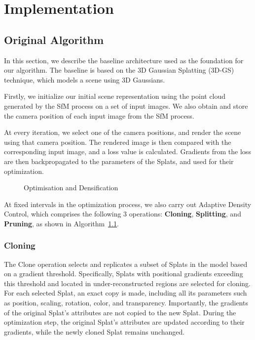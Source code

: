 \documentclass[11pt]{report}
\begin{document}
\chapter{Implementation}

\section{Original Algorithm}

In this section, we describe the baseline architecture used as the foundation for our algorithm. The baseline is based on the 3D Gaussian Splatting (3D-GS) technique, which models a scene using 3D Gaussians. 

Firstly, we initialize our initial scene representation using the point cloud generated by the SfM process on a set of input images. We also obtain and store the camera position of each input image from the SfM process.

At every iteration, we select one of the camera positions, and render the scene using that camera position. The rendered image is then compared with the corresponding input image, and a loss value is calculated. Gradients from the loss are then backpropagated to the parameters of the Splats, and used for their optimization.

\begin{figure}[htbp]%
    \centering
    \begin{minipage}{0.75\textwidth}

            \begin{algorithm}[H]
                
                \caption{Optimisation and Densification}
                \label{alg:original_algorithm} 
            \end{algorithm}
    \end{minipage}
\end{figure}

At fixed intervals in the optimization process, we also carry out Adaptive Density Control, which comprises the following 3 operations: \textbf{Cloning}, \textbf{Splitting}, and \textbf{Pruning}, as shown in Algorithm~\ref{alg:original_algorithm}.

\subsection{Cloning}
The Clone operation selects and replicates a subset of Splats in the model based on a gradient threshold. Specifically, Splats with positional gradients exceeding this threshold and located in under-reconstructed regions are selected for cloning. For each selected Splat, an exact copy is made, including all its parameters such as position, scaling, rotation, color, and transparency. Importantly, the gradients of the original Splat's attributes are not copied to the new Splat. During the optimization step, the original Splat's attributes are updated according to their gradients, while the newly cloned Splat remains unchanged.
\end{document}
